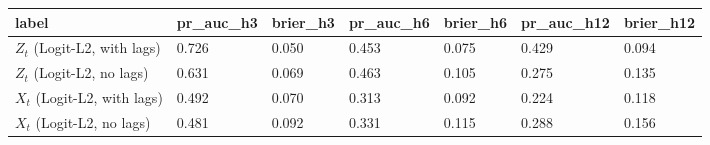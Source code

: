 \begin{tabular}{lllllll}
\toprule
label & pr_auc_h3 & brier_h3 & pr_auc_h6 & brier_h6 & pr_auc_h12 & brier_h12 \\
\midrule
$Z_t$ (Logit-L2, with lags) & 0.726 & 0.050 & 0.453 & 0.075 & 0.429 & 0.094 \\
$Z_t$ (Logit-L2, no lags) & 0.631 & 0.069 & 0.463 & 0.105 & 0.275 & 0.135 \\
$X_t$ (Logit-L2, with lags) & 0.492 & 0.070 & 0.313 & 0.092 & 0.224 & 0.118 \\
$X_t$ (Logit-L2, no lags) & 0.481 & 0.092 & 0.331 & 0.115 & 0.288 & 0.156 \\
\bottomrule
\end{tabular}
